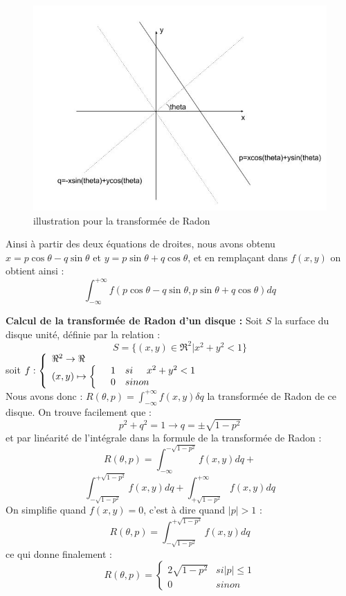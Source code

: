 \documentclass[conference]{IEEEtran}
\begin{document}
\begin{figure}[H]
\centering
\includegraphics[scale=0.5]{L}
\caption[Radon]{illustration pour la transformée de Radon}
\label{fig:gallery}
\end{figure}

Ainsi à partir des deux équations de droites, nous avons obtenu $x=p\cos\theta-q\sin\theta$
et $y=p\sin\theta+q\cos\theta$, et en remplaçant dans $f(x,y)$ on obtient ainsi :
 \[ \int_{-\infty}^{+\infty} f(p\cos\theta-q\sin\theta, p\sin\theta+q\cos\theta)dq\]

\textbf{Calcul de la transformée de Radon d'un disque : }
Soit $S$ la surface du disque unité, définie par la relation : \[S=\{(x,y)\in \Re^2|x^2+y^2<1\}\]
soit $f :\left\{\begin{array}{lcl}
\Re^2 \to \Re \\
(x,y) \mapsto \left\{ \begin{array}{lcl}
&1 &si \hspace{0.5cm} x^2+y^2<1 \\
&0 &sinon 
\end{array}
\right.
\end{array}
\right.
$
\[\]
Nous avons donc : $R(\theta, p)=\int_{-\infty}^{+\infty} f(x,y) \delta q$ la transformée de Radon de ce disque. On trouve facilement que :
\[p^2+q^2=1 \rightarrow q=\pm \sqrt{1-p^2} \]
et par linéarité de l'intégrale dans la formule de la transformée de Radon :
\[R(\theta,p)=\int_{-\infty}^{-\sqrt{1-p^2}} f(x,y) dq + \]
\[ \int_{-\sqrt{1-p^2}}^{+\sqrt{1-p^2}} f(x,y) dq+\int_{+\sqrt{1-p^2}}^{+\infty} f(x,y) dq \]
On simplifie quand $f(x,y)=0$, c'est à dire quand $|p|>1$  :
\[R(\theta,p)=\int_{-\sqrt{1-p^2}}^{+\sqrt{1-p^2}} f(x,y) dq\]
ce qui donne finalement :
\[R(\theta,p)= \left\{\begin{array}{lcl}
2\sqrt{1-p^2} & si |p| \leq 1 \\
0 & sinon
\end{array}
\right. \]
\end{document}
